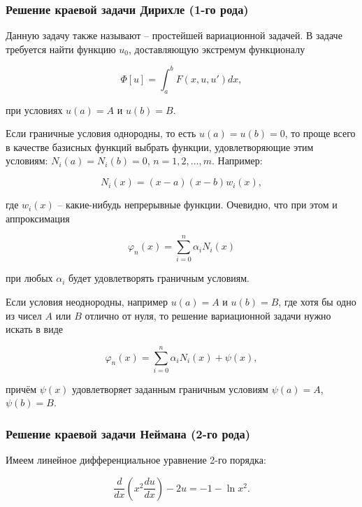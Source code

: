 \documentclass{article}
\begin{document}
\subsubsection{Решение краевой задачи Дирихле (1-го рода)}

Данную задачу также называют – простейшей вариационной задачей. В задаче требуется найти функцию $u_{0}$, доставляющую экстремум функционалу

\begin{displaymath}
	\Phi[u] = \int_{a}^{b} F(x, u, u')dx,
\end{displaymath}

\noindent при условиях $u(a) = A$ и $u(b) = B$.

Если граничные условия однородны, то есть $u(a) = u(b) = 0$, то проще всего в качестве базисных функций выбрать функции, удовлетворяющие этим условиям: $N_{i}(a) = N_{i}(b) = 0$, $n = 1, 2, \ldots, m$. Например:

\begin{displaymath}
	N_{i}(x) = (x-a)(x-b)w_{i}(x),
\end{displaymath}

\noindent где $w_{i}(x)$ – какие-нибудь непрерывные функции. Очевидно, что при этом и аппроксимация 

\begin{displaymath}
	\varphi_{n}(x) = \sum_{i=0}^n \alpha_{i}N_{i}(x)
\end{displaymath}

\noindent при любых $\alpha_{i}$ будет удовлетворять граничным условиям.

Если условия неоднородны, например $u(a) = A$ и $u(b) = B$, где хотя бы одно из чисел $A$ или $B$ отлично от нуля, то решение вариационной задачи нужно искать в виде

\begin{equation}\label{equation_solve_var_rank_2}
	\varphi_{n}(x) = \sum_{i=0}^n \alpha_{i}N_{i}(x) + \psi(x),
\end{equation}

\noindent причём $\psi(x)$ удовлетворяет заданным граничным условиям $\psi(a) = A$, $\psi(b) = B$.

\subsubsection{Решение краевой задачи Неймана (2-го рода)}

Имеем линейное дифференциальное уравнение 2-го порядка:

\begin{displaymath}
	\frac{d}{dx} \left( x^2 \frac{d u}{dx} \right) - 2u = -1 - \ln{x^2}.
\end{displaymath}
\end{document}
